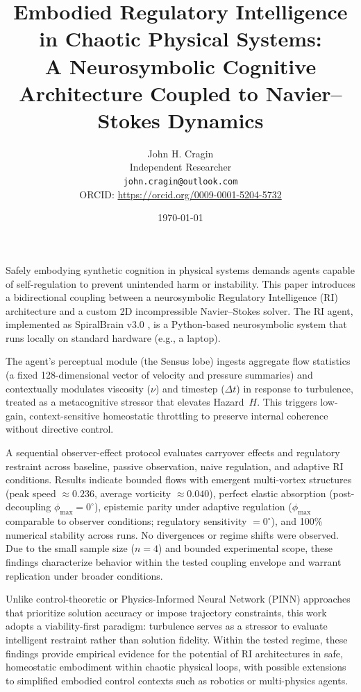 \documentclass[12pt,a4paper]{article}
\title{Embodied Regulatory Intelligence \\
\Large in Chaotic Physical Systems: \\
\small A Neurosymbolic Cognitive Architecture Coupled to Navier--Stokes Dynamics}
\author{
John H. Cragin\\
Independent Researcher\\
\texttt{john.cragin@outlook.com}\\
ORCID: \url{https://orcid.org/0009-0001-5204-5732}
}
\date{\today{}}
\renewenvironment{abstract}{
    \begin{center}
        {\large\bfseries \abstractname\vspace{-.5em}\vspace{0pt}}
    \end{center}
}{}
\begin{document}
\maketitle

\thispagestyle{empty}

\begin{abstract}
Safely embodying synthetic cognition in physical systems demands agents capable of self-regulation to prevent unintended harm or instability. This paper introduces a bidirectional coupling between a neurosymbolic Regulatory Intelligence (RI) architecture and a custom 2D incompressible Navier--Stokes solver. The RI agent, implemented as SpiralBrain v3.0 \cite{SpiralBrainV3}, is a Python-based neurosymbolic system that runs locally on standard hardware (e.g., a laptop).

The agent’s perceptual module (the Sensus lobe) ingests aggregate flow statistics (a fixed 128-dimensional vector of velocity and pressure summaries) and contextually modulates viscosity ($\nu$) and timestep ($\Delta t$) in response to turbulence, treated as a metacognitive stressor that elevates Hazard~$H$. This triggers low-gain, context-sensitive homeostatic throttling to preserve internal coherence without directive control.

A sequential observer-effect protocol evaluates carryover effects and regulatory restraint across baseline, passive observation, naive regulation, and adaptive RI conditions. Results indicate bounded flows with emergent multi-vortex structures (peak speed $\approx 0.236$, average vorticity $\approx 0.040$), perfect elastic absorption (post-decoupling $\phi_{\max}=0^\circ$), epistemic parity under adaptive regulation ($\phi_{\max}$ comparable to observer conditions; regulatory sensitivity $=0^\circ$), and 100\% numerical stability across runs. No divergences or regime shifts were observed. Due to the small sample size ($n=4$) and bounded experimental scope, these findings characterize behavior within the tested coupling envelope and warrant replication under broader conditions.

Unlike control-theoretic or Physics-Informed Neural Network (PINN) approaches that prioritize solution accuracy or impose trajectory constraints, this work adopts a viability-first paradigm: turbulence serves as a stressor to evaluate intelligent restraint rather than solution fidelity. Within the tested regime, these findings provide empirical evidence for the potential of RI architectures in safe, homeostatic embodiment within chaotic physical loops, with possible extensions to simplified embodied control contexts such as robotics or multi-physics agents.
\end{abstract}
\end{document}
